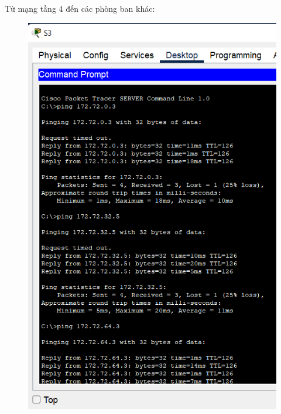 \begin{enumerate}
\begin{enumerate}
Từ mạng tầng 4 đến các phòng ban khác:
\begin{figure}[H]
\begin{center}
\includegraphics[scale=.5]{../figures/p2/test-ping-11}

\end{center}
\end{figure}
\end{enumerate}
\end{enumerate}
